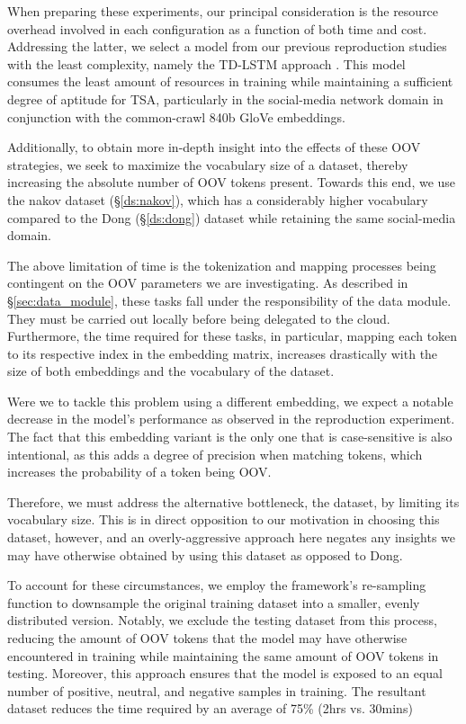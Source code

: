 \documentclass[../../fyp.tex]{subfiles}
\begin{document}
When preparing these experiments, our principal consideration is the resource overhead involved in each configuration as a function of both time and cost. Addressing the latter, we select a model from our previous reproduction studies with the least complexity, namely the TD-LSTM approach \cite{tang2016b}. This model consumes the least amount of resources in training while maintaining a sufficient degree of aptitude for TSA, particularly in the social-media network domain in conjunction with the common-crawl 840b GloVe embeddings. 

Additionally, to obtain more in-depth insight into the effects of these OOV strategies, we seek to maximize the vocabulary size of a dataset, thereby increasing the absolute number of OOV tokens present. Towards this end, we use the nakov dataset (\S\ref{ds:nakov}), which has a considerably higher vocabulary compared to the Dong (\S\ref{ds:dong}) dataset while retaining the same social-media domain.

The above limitation of time is the tokenization and mapping processes being contingent on the OOV parameters we are investigating. As described in \S\ref{sec:data_module}, these tasks fall under the responsibility of the data module. They must be carried out locally before being delegated to the cloud. Furthermore, the time required for these tasks, in particular, mapping each token to its respective index in the embedding matrix, increases drastically with the size of both embeddings and the vocabulary of the dataset.

Were we to tackle this problem using a different embedding, we expect a notable decrease in the model's performance as observed in the reproduction experiment. The fact that this embedding variant is the only one that is case-sensitive is also intentional, as this adds a degree of precision when matching tokens, which increases the probability of a token being OOV. 

Therefore, we must address the alternative bottleneck, the dataset, by limiting its vocabulary size. This is in direct opposition to our motivation in choosing this dataset, however, and an overly-aggressive approach here negates any insights we may have otherwise obtained by using this dataset as opposed to Dong.

To account for these circumstances, we employ the framework's re-sampling function to downsample the original training dataset into a smaller, evenly distributed version. Notably, we exclude the testing dataset from this process, reducing the amount of OOV tokens that the model may have otherwise encountered in training while maintaining the same amount of OOV tokens in testing. Moreover, this approach ensures that the model is exposed to an equal number of positive, neutral, and negative samples in training.
The resultant dataset reduces the time required by an average of 75\% (2hrs vs. 30mins)
\end{document}

